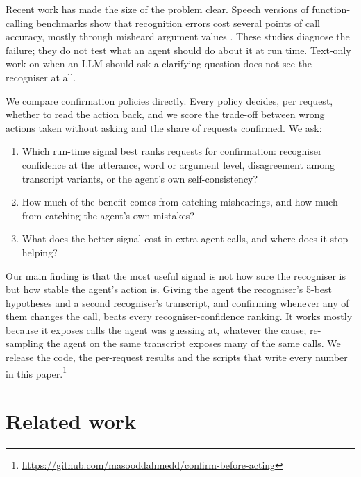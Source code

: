 \documentclass[11pt]{article}
\begin{document}
Recent work has made the size of the problem clear. Speech versions of function-calling benchmarks show that recognition errors cost several points of call accuracy, mostly through misheard argument values \citep{mao2026bfclaudio,wang2026speechevalx,laskar2026texttovoice,jain2025voiceagentbench}. These studies diagnose the failure; they do not test what an agent should do about it at run time. Text-only work on when an LLM should ask a clarifying question \citep{kuhn2022clam,zhang2025clarify,ross2025when2call,suri2026sage} does not see the recogniser at all.

We compare confirmation policies directly. Every policy decides, per request, whether to read the action back, and we score the trade-off between wrong actions taken without asking and the share of requests confirmed. We ask:
\begin{enumerate}
\item Which run-time signal best ranks requests for confirmation: recogniser confidence at the utterance, word or argument level, disagreement among transcript variants, or the agent's own self-consistency?
\item How much of the benefit comes from catching mishearings, and how much from catching the agent's own mistakes?
\item What does the better signal cost in extra agent calls, and where does it stop helping?
\end{enumerate}

Our main finding is that the most useful signal is not how sure the recogniser is but how stable the agent's action is. Giving the agent the recogniser's 5-best hypotheses and a second recogniser's transcript, and confirming whenever any of them changes the call, beats every recogniser-confidence ranking. It works mostly because it exposes calls the agent was guessing at, whatever the cause; re-sampling the agent on the same transcript exposes many of the same calls. We release the code, the per-request results and the scripts that write every number in this paper.\footnote{\url{https://github.com/masooddahmedd/confirm-before-acting}}

\section{Related work}
\end{document}
